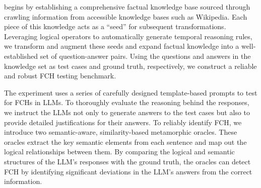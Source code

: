 \tool begins by establishing a comprehensive factual knowledge base sourced through crawling information from accessible knowledge bases such as Wikipedia. Each piece of this knowledge acts as a ``seed'' for subsequent transformations. Leveraging logical operators to automatically generate temporal reasoning rules, we transform and augment these seeds and expand factual knowledge into a well-established set of question-answer pairs.
Using the questions and answers in the knowledge set as test cases and ground truth, respectively, we construct a reliable and robust FCH testing benchmark. 


The experiment uses a series of carefully designed template-based prompts to test for FCHs in LLMs. To thoroughly evaluate the reasoning behind the responses, we instruct the LLMs not only to generate answers to the test cases but also to provide detailed justifications for their answers. To reliably identify FCH, we introduce two semantic-aware, similarity-based metamorphic oracles. These oracles extract the key semantic elements from each sentence and map out the logical relationships between them. By comparing the logical and semantic structures of the LLM's responses with the ground truth, the oracles can detect FCH by identifying significant deviations in the LLM's answers from the correct information.






